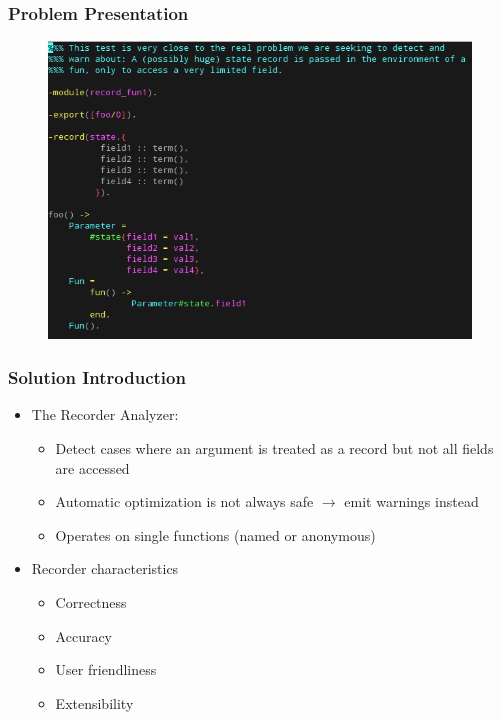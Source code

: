 \begin{frame}
  \frametitle{Problem Presentation}
  
  \begin{figure}
    \centering
    \includegraphics[scale=0.45]{../figures/problem_introduction}
  \end{figure}
  
\end{frame}

\begin{frame}
  \frametitle{Solution Introduction}
  
  \begin{itemize}
  \item The Recorder Analyzer:
    \begin{itemize}
    \item Detect cases where an argument is treated as a record but not all
      fields are accessed
    \item Automatic optimization is not always safe $\to$ emit warnings instead
    \item Operates on single functions (named or anonymous)
    \end{itemize}
  \item Recorder characteristics
    \begin{itemize}
    \item Correctness
    \item Accuracy
    \item User friendliness
    \item Extensibility
    \end{itemize}
  \end{itemize}
  
\end{frame}
